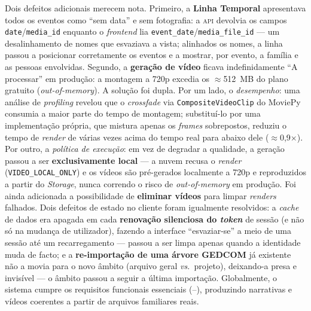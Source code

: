 Dois defeitos adicionais merecem nota. Primeiro, a \textbf{Linha Temporal}
apresentava todos os eventos como ``sem data'' e sem fotografia: a
\textsc{api} devolvia os campos \texttt{date}/\texttt{media\_id} enquanto o
\emph{frontend} lia \texttt{event\_date}/\texttt{media\_file\_id} — um
desalinhamento de nomes que esvaziava a vista; alinhados os nomes, a linha
passou a posicionar corretamente os eventos e a mostrar, por evento, a
família e as pessoas envolvidas. Segundo, a \textbf{geração de vídeo} ficava
indefinidamente ``A processar'' em produção: a montagem a 720p excedia os
$\approx$512~MB do plano gratuito (\emph{out-of-memory}). A solução foi
dupla. Por um lado, o \emph{desempenho}: uma análise de \emph{profiling} revelou que o
\emph{crossfade} via \texttt{CompositeVideoClip} do MoviePy consumia a maior
parte do tempo de montagem; substituí-lo por uma implementação própria, que
mistura apenas os \emph{frames} sobrepostos, reduziu o tempo de
\emph{render} de várias vezes acima do tempo real para abaixo dele
($\approx$0{,}9$\times$). Por outro, a \emph{política de execução}: em vez de
degradar a qualidade, a geração passou a ser \textbf{exclusivamente local}
--- a nuvem recusa o \emph{render} (\texttt{VIDEO\_LOCAL\_ONLY}) e os vídeos
são pré-gerados localmente a 720p e reproduzidos a partir do \emph{Storage},
nunca correndo o risco de \emph{out-of-memory} em produção. Foi ainda
adicionada a possibilidade de \textbf{eliminar vídeos} para limpar
\emph{renders} falhados. Dois defeitos de estado no cliente foram
igualmente resolvidos: a \emph{cache} de dados era apagada em cada
\textbf{renovação silenciosa do \emph{token}} de sessão (e não só na
mudança de utilizador), fazendo a interface ``esvaziar-se'' a meio de uma
sessão até um recarregamento --- passou a ser limpa apenas quando a
identidade muda de facto; e a \textbf{re-importação de uma árvore GEDCOM}
já existente não a movia para o novo âmbito (arquivo geral \emph{vs.}\
projeto), deixando-a presa e invisível --- o âmbito passou a seguir a
última importação. Globalmente, o sistema cumpre os requisitos funcionais
essenciais (\rf{1}--\rf{15}), produzindo narrativas e vídeos coerentes a
partir de arquivos familiares reais.
